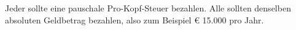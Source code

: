 Jeder sollte eine pauschale Pro-Kopf-Steuer bezahlen.
Alle sollten denselben absoluten Geldbetrag bezahlen, also zum Beispiel € 15.000 pro Jahr.